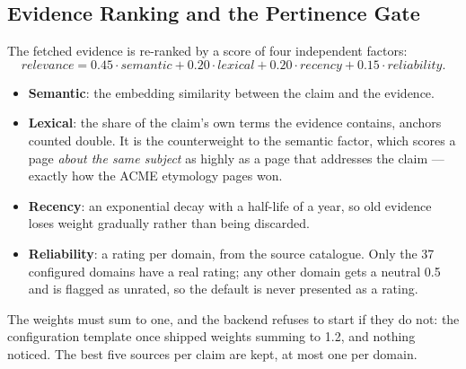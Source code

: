 
\subsection{Evidence Ranking and the Pertinence Gate}
\label{subsec:ranking}

The fetched evidence is re-ranked by a score of four independent
factors:
\[
  \textit{relevance} = 0.45\cdot\textit{semantic}
    + 0.20\cdot\textit{lexical}
    + 0.20\cdot\textit{recency}
    + 0.15\cdot\textit{reliability}.
\]

\begin{itemize}
    \item \textbf{Semantic}: the embedding similarity between the claim
    and the evidence.
    \item \textbf{Lexical}: the share of the claim's own terms the
    evidence contains, anchors counted double. It is the counterweight
    to the semantic factor, which scores a page \emph{about the same
    subject} as highly as a page that addresses the claim --- exactly
    how the ACME etymology pages won.
    \item \textbf{Recency}: an exponential decay with a half-life of a
    year, so old evidence loses weight gradually rather than being
    discarded.
    \item \textbf{Reliability}: a rating per domain, from the source
    catalogue. Only the 37 configured domains have a real rating; any
    other domain gets a neutral 0.5 and is flagged as unrated, so the
    default is never presented as a rating.
\end{itemize}

The weights must sum to one, and the backend refuses to start if they
do not: the configuration template once shipped weights summing to 1.2,
and nothing noticed. The best five sources per claim are kept, at most
one per domain.

